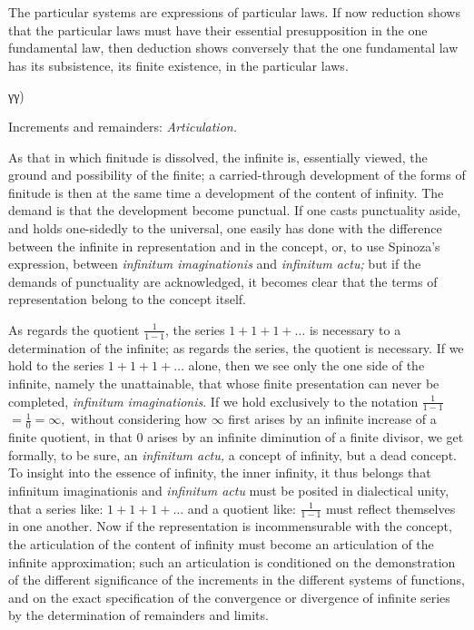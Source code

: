 \documentclass[12pt,a4paper,openany]{book}
\newcommand{\opage}[1]{\marginnote{\footnotesize\textit{[#1]}}}
\begin{document}
The particular systems are expressions of particular laws. If now reduction shows that the particular laws must have their
\setcounter{footnote}{0}%
\opage{52}essential presupposition in the one fundamental law, then deduction shows conversely that the one fundamental law has its subsistence, its finite existence, in the particular laws.

\begin{center}γγ)

Increments and remainders: \emph{Articulation.}\end{center}

As that in which finitude is dissolved, the infinite is, essentially viewed, the ground and possibility of the finite; a carried-through development of the forms of finitude is then at the same time a development of the content of infinity. The demand is that the development become punctual. If one casts punctuality aside, and holds one-sidedly to the universal, one easily has done with the difference between the infinite in representation and in the concept, or, to use Spinoza's expression, between \textit{infinitum imaginationis} and \textit{infinitum actu;} but if the demands of punctuality are acknowledged, it becomes clear that the terms of representation belong to the concept itself.

As regards the quotient $\frac{1}{1-1}$, the series $1+1+1+\ldots$ is necessary to a determination of the infinite; as regards the series, the quotient is necessary. If we hold to the series $1+1+1+\ldots$ alone, then we see only the one side of the infinite, namely the unattainable, that whose finite presentation can never be completed, \textit{infinitum imaginationis}.
If we hold exclusively to the notation $\frac{1}{1-1}$
$=\frac{1}{0}=\infty,$ without considering how $\infty$ first arises by an infinite increase of a finite quotient, in that $0$ arises by an infinite diminution of a finite divisor, we get formally, to be sure, an \textit{infinitum actu,} a concept of infinity, but a dead concept. To insight into the essence of infinity, the inner infinity, it thus belongs that infinitum imaginationis and \textit{infinitum actu} must be posited in dialectical unity, that a series like: $1+1+1+\ldots$ and a quotient like: $\frac{1}{1-1}$ must reflect themselves in one another.
\setcounter{footnote}{0}%
\opage{53}Now if the representation is incommensurable with the concept, the articulation of the content of infinity must become an articulation of the infinite approximation; such an articulation is conditioned on the demonstration of the different significance of the increments in the different systems of functions, and on the exact specification of the convergence or divergence of infinite series by the determination of remainders and limits.
\end{document}
